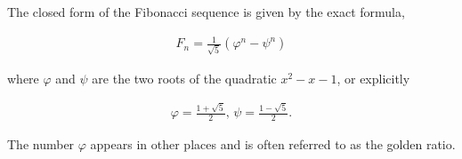 \documentclass[twoside]{report}
\begin{document}
\vspace{\baselineskip}
\begin{theorem}
	The closed form of the Fibonacci sequence is given by the exact formula,
	
	\begin{align*}
		F_n = \frac{1}{\sqrt{5}}\left( \varphi^n - \psi^n \right)
	\end{align*}
	
	where $\varphi$ and $\psi$ are the two roots of the quadratic $x^2 - x - 1$, or explicitly
	
	\begin{align*}
		\varphi = \frac{1 + \sqrt{5}}{2}, \, \psi = \frac{1 - \sqrt{5}}{2}.
	\end{align*}
	
	The number $\varphi$ appears in other places and is often referred to as the golden ratio.
\end{theorem}
\end{document}
